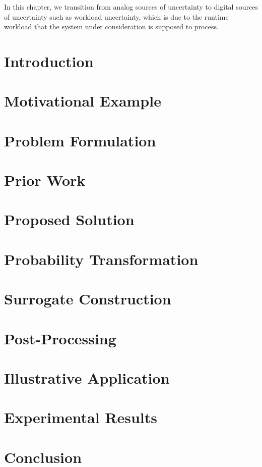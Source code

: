 In this chapter, we transition from analog sources of uncertainty to digital
sources of uncertainty such as workload uncertainty, which is due to the runtime
workload that the system under consideration is supposed to process.

\section{Introduction}

\section{Motivational Example}

\section{Problem Formulation}

\section{Prior Work}

\section{Proposed Solution}

\section{Probability Transformation}

\section{Surrogate Construction}

\section{Post-Processing}

\section{Illustrative Application}

\section{Experimental Results}

\section{Conclusion}
